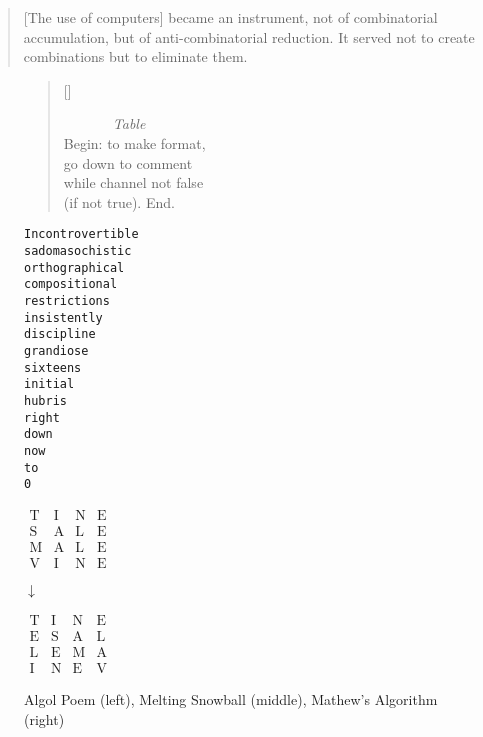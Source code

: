 \begin{quotation}
  [The use of computers] became an instrument, not of combinatorial accumulation, but of anti-combinatorial reduction. It served not to create combinations but to eliminate them.
\end{quotation}

\begin{figure}[!htbp]
\begin{minipage}{.42\linewidth}
  \settowidth{\versewidth}{while channel not false} 
  \begin{verse}[\versewidth]
  \begin{patverse}\ttfamily
    ~~~~~~~\textit{Table}\\
    Begin: to make format,\\
    go down to comment\\
    while channel not false\\
      (if not true). End.\\ 
  \end{patverse}
  \end{verse}
\end{minipage}
\begin{minipage}{.32\linewidth}
  \begin{alltt}\ttfamily\centering
    Incontrovertible
    sadomasochistic
    orthographical
    compositional
    restrictions 
    insistently
    discipline
    grandiose
    sixteens
    initial
    hubris
    right
    down
    now
    to
    0
  \end{alltt}
\end{minipage}
\begin{minipage}{.24\linewidth}
  \centering
  $\begin{matrix}
    \text{T}&\text{I}&\text{N}&\text{E}\\
    \text{S}&\text{A}&\text{L}&\text{E}\\
    \text{M}&\text{A}&\text{L}&\text{E}\\
    \text{V}&\text{I}&\text{N}&\text{E}
  \end{matrix}$

  \vspace{5mm}

  $\downarrow$

  \vspace{5mm}

  $\begin{matrix}
    \text{T}&\text{I}&\text{N}&\text{E}\\
    \text{E}&\text{S}&\text{A}&\text{L}\\
    \text{L}&\text{E}&\text{M}&\text{A}\\
    \text{I}&\text{N}&\text{E}&\text{V}
  \end{matrix}$
\end{minipage}
\caption[Algol Poem, Melting Snowball, Mathew's Algorithm]{Algol Poem (left), Melting Snowball (middle), Mathew's Algorithm (right)}
\label{fig:poems}
\end{figure}

